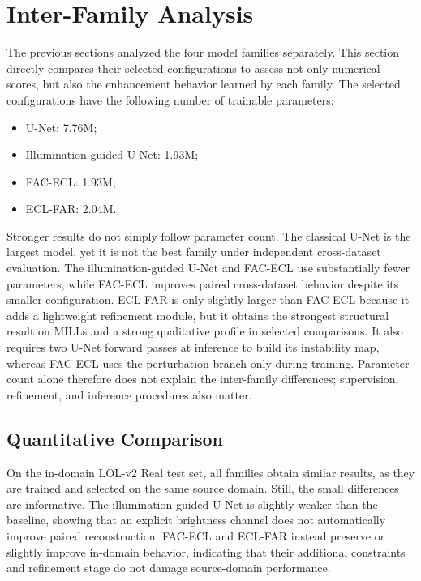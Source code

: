 \section{Inter-Family Analysis}

The previous sections analyzed the four model families separately. This section directly compares their selected configurations to assess not only numerical scores, but also the enhancement behavior learned by each family. The selected configurations have the following number of trainable parameters:
\begin{itemize}[topsep=5pt]
	\item U-Net: 7.76M;
	\item Illumination-guided U-Net: 1.93M;
	\item FAC-ECL: 1.93M;
	\item ECL-FAR: 2.04M.
\end{itemize}

Stronger results do not simply follow parameter count. The classical U-Net is the largest model, yet it is not the best family under independent cross-dataset evaluation. The illumination-guided U-Net and FAC-ECL use substantially fewer parameters, while FAC-ECL improves paired cross-dataset behavior despite its smaller configuration. ECL-FAR is only slightly larger than FAC-ECL because it adds a lightweight refinement module, but it obtains the strongest structural result on MILLs and a strong qualitative profile in selected comparisons. It also requires two U-Net forward passes at inference to build its instability map, whereas FAC-ECL uses the perturbation branch only during training. Parameter count alone therefore does not explain the inter-family differences; supervision, refinement, and inference procedures also matter.

\subsection{Quantitative Comparison}

On the in-domain LOL-v2 Real test set, all families obtain similar results, as they are trained and selected on the same source domain. Still, the small differences are informative. The illumination-guided U-Net is slightly weaker than the baseline, showing that an explicit brightness channel does not automatically improve paired reconstruction. FAC-ECL and ECL-FAR instead preserve or slightly improve in-domain behavior, indicating that their additional constraints and refinement stage do not damage source-domain performance.

